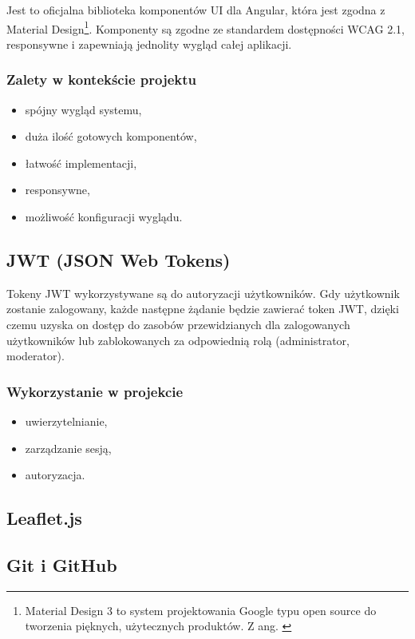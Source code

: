 Jest to oficjalna biblioteka komponentów UI dla Angular, która jest zgodna z Material Design\footnote{Material Design 3 to system projektowania Google typu open source do tworzenia pięknych, użytecznych produktów. Z ang. \cite{material_design}}.
Komponenty są zgodne ze standardem dostępności WCAG 2.1, responsywne i zapewniają jednolity wygląd całej aplikacji.

\subsubsection{Zalety w kontekście projektu}
\begin{itemize}
	\item spójny wygląd systemu,
	\item duża ilość gotowych komponentów,
	\item łatwość implementacji,
	\item responsywne,
	\item możliwość konfiguracji wyglądu.
\end{itemize}

\subsection{JWT (JSON Web Tokens)}

Tokeny JWT wykorzystywane są do autoryzacji użytkowników. Gdy użytkownik zostanie zalogowany, każde następne żądanie będzie zawierać token JWT, dzięki czemu uzyska on dostęp do zasobów przewidzianych dla zalogowanych użytkowników lub zablokowanych za odpowiednią rolą (administrator, moderator).

\subsubsection{Wykorzystanie w projekcie}

\begin{itemize}
	\item uwierzytelnianie,
	\item zarządzanie sesją,
	\item autoryzacja.
\end{itemize}

\subsection{Leaflet.js}

\subsection{Git i GitHub}


